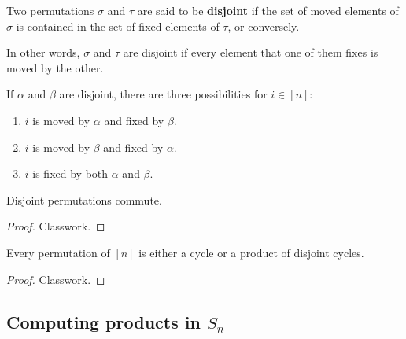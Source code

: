 \documentclass[11pt,a4paper]{article}
\begin{document}
\begin{defi}
    Two permutations \(\sigma\) and \(\tau\) are said to be \textbf{disjoint} if the set of moved elements of \(\sigma\) is contained in the set  of fixed elements of \(\tau\), or conversely.
\end{defi}

In other words, \(\sigma\) and \(\tau\) are disjoint if every element that one of them fixes is moved by the other.

\begin{rem}
    If \( \alpha \) and \( \beta \) are disjoint, there are three possibilities for \( i\in [n] \):
\begin{enumerate}[label=(\roman*)]
    \item \( i \) is moved by \( \alpha \) and fixed by \( \beta \).
    \item \( i \) is moved by \( \beta \) and fixed by \( \alpha \).
    \item \( i \) is fixed by both \( \alpha \) and \( \beta \).
\end{enumerate}
\end{rem}


\begin{lem}
    Disjoint permutations commute.
\end{lem}

\begin{proof}
    Classwork.
\end{proof}



\begin{lem}
    Every permutation of \([n]\) is either a cycle or a product of disjoint cycles.
\end{lem}

\begin{proof}
    Classwork.
\end{proof}



\subsection[]{Computing products in \(S_n\)}
\end{document}
